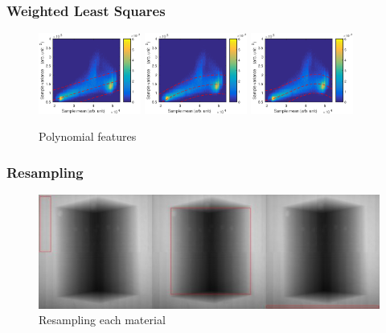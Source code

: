 \documentclass{beamer}
\begin{document}
\begin{frame}
\frametitle{Weighted Least Squares}
\begin{figure}
	\centering
		\includegraphics[width=0.3\textwidth]{figures/meanVar/order1.eps}
		\includegraphics[width=0.3\textwidth]{figures/meanVar/order2.eps}
		\includegraphics[width=0.3\textwidth]{figures/meanVar/order3.eps}
	\caption{Polynomial features}
\end{figure}
\end{frame}

\begin{frame}
\frametitle{Resampling}
\begin{figure}
	\includegraphics[width = \textwidth]{figures/meanVar/subsample_images.jpg}
	\caption{Resampling each material}
\end{figure}
\end{frame}
\end{document}
